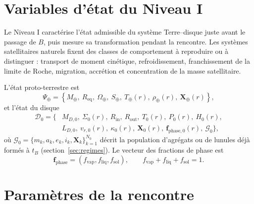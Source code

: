 \documentclass[11pt,a4paper,openany]{report}
\newcommand{\Mt}{M_{\oplus}}
\newcommand{\Req}{R_{\mathrm{eq}}}
\begin{document}
\section{Variables d'état du Niveau I}

Le Niveau I caractérise l'état admissible du système Terre--disque juste avant le passage de $B$,
puis mesure sa transformation pendant la rencontre. Les systèmes satellitaires naturels fixent
des classes de comportement à reproduire ou à distinguer : transport de moment cinétique,
refroidissement, franchissement de la limite de Roche, migration, accrétion et concentration de
la masse satellitaire.

L'état proto-terrestre est
\begin{equation}
\Psi_\oplus=\left\{\Mt,\ \Req,\ \Omega_\oplus,\ S_\oplus,\ T_\oplus(r),\ \rho_\oplus(r),\
\mathbf{X}_\oplus(r)\right\},
\label{eq:Psiterre}
\end{equation}
et l'état du disque
\begin{equation}
\begin{aligned}
\mathcal{D}_0=\Big\{&M_{D,0},\ \Sigma_0(r),\ R_{\mathrm{in}},\ R_{\mathrm{out}},\ T_0(r),\
P_0(r),\ H_0(r),\\
&L_{D,0},\ v_{r,0}(r),\ \kappa_0(r),\ \mathbf{X}_0(r),\
\mathbf{f}_{\mathrm{phase},0}(r),\ \mathcal{G}_0\Big\},
\end{aligned}
\label{eq:D0}
\end{equation}
où $\mathcal{G}_0=\{m_k,a_k,e_k,i_k,\mathbf{X}_k\}_{k=1}^{N_0}$ décrit la population
d'agrégats ou de lunules déjà formés à $t_B$ (section~\ref{sec:regimes}). Le vecteur des fractions
de phase est
\begin{equation}
\mathbf{f}_{\mathrm{phase}}=(f_{\mathrm{vap}},f_{\mathrm{liq}},f_{\mathrm{sol}}),\qquad
f_{\mathrm{vap}}+f_{\mathrm{liq}}+f_{\mathrm{sol}}=1.
\label{eq:fphase}
\end{equation}

\section{Paramètres de la rencontre}
\end{document}
